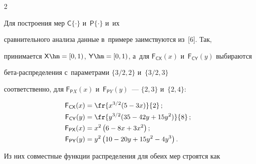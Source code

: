 \begin{multicols}{2}
  


  Для построения мер ${\mathsf C}\{\cdot\}$ и~${\mathsf P}\{\cdot\}$ и~их 


сравнительного анализа данные в~примере заимствуются из~[6]. Так, 


принимается ${\mathsf X}\hm=[0,1)$, ${\mathsf Y}\hm=[0,1)$, а~для ${\mathsf 


F}_{\mathsf {CX}}(x)$ и~${\mathsf F}_{\mathsf{CY}}(y)$ выбираются  


бе\-та-рас\-пре\-де\-ле\-ния с~па\-ра\-мет\-ра\-ми $\{3/2,2\}$ и~$\{3/2,3\}$ 


соответственно, для ${\mathsf F}_{\mathsf PX}(x)$ и~${\mathsf F}_{\mathsf PY}(y)$~--- $\{2,3\}$ и~$\{2,4\}$:





\vspace*{-2pt}





\noindent


  \begin{align*}


  {\mathsf F}_{\mathsf {CX}} (x) &= \fr{x^{3/2}(5-3x)}{2}\,;\\  


  {\mathsf F}_{\mathsf {CY}}(y)&= \fr{y^{3/2}(35-42y+15y^2)}{8}\,;\\


  {\mathsf F}_{\mathsf {PX}}(x) &= x^2\left(6-8x+3x^2\right);\\


  {\mathsf F}_{\mathsf {PY}}(y)&= y^2\left( 10-20y+15y^2-4y^3\right).


  \end{align*}




  


  \vspace*{-2pt}


  


  \noindent


  Из них совместные функции распределения для обеих мер строятся как


  


  \vspace*{-5pt}


  


  \noindent 



\end{multicols}
